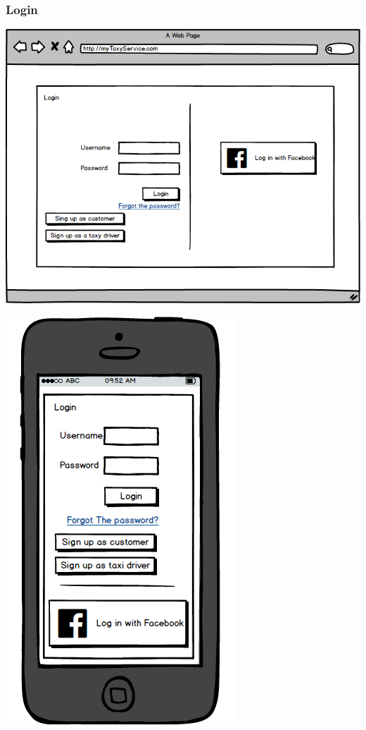 \documentclass{report}
\begin{document}
			\subsubsection{Login}
			\begin{center}
			
			\includegraphics[scale=0.4]{IMG/UserInterfaces/CustomerLogin.png}
			
			
			\end{center}
			\begin{center}
			
			
			\includegraphics[scale=0.4]{IMG/UserInterfaces/CustomerLogin_m.png}
			\end{center}
\end{document}
